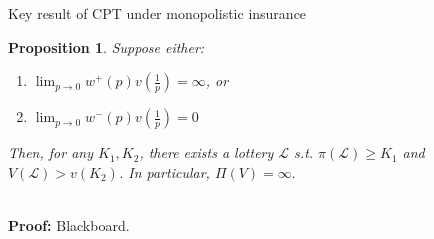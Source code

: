 \documentclass[11pt, aspectratio=169]{beamer}
\newtheorem{proposition}{Proposition}
\begin{document}
       \begin{frame}{Key result of CPT under monopolistic insurance}
           \begin{proposition}
           Suppose either:\medskip
           \begin{enumerate}[(1)]
               \item $\lim_{p \to 0} w^{+}(p)v\left(\frac{1}{p}\right)=\infty$, or\medskip
               \item $\lim_{p \to 0} w^{-}(p)v\left(\frac{1}{p}\right)=0$\medskip
           \end{enumerate}
           Then, for any $K_1,K_2$, there exists a lottery $\mathcal{L}$ 
           s.t. $\pi(\mathcal{L}) \geq K_1$ and $V(\mathcal{L}) >v(K_2)$. 
           In particular, $\Pi(V)=\infty.$
           \end{proposition}
           \hspace*{\fill} \\
       \textbf{Proof:} Blackboard.
       \end{frame}
    


       
\end{document}
